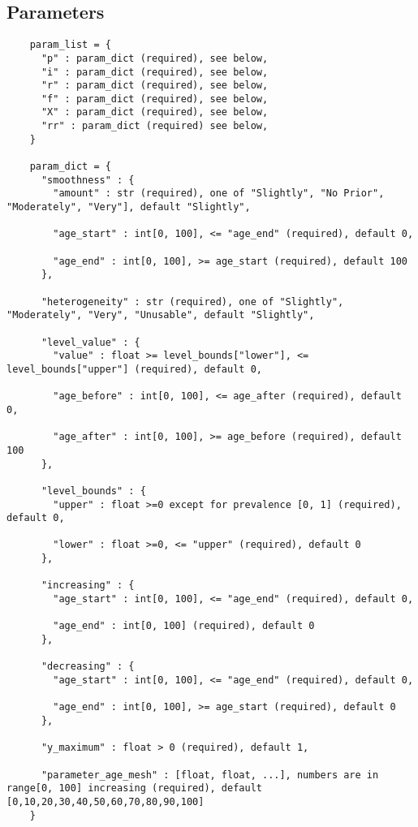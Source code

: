 \subsection{Parameters}
\begin{verbatim}
    param_list = {
      "p" : param_dict (required), see below,
      "i" : param_dict (required), see below,
      "r" : param_dict (required), see below,
      "f" : param_dict (required), see below,
      "X" : param_dict (required), see below,
      "rr" : param_dict (required) see below,
    }

    param_dict = {
      "smoothness" : {
        "amount" : str (required), one of "Slightly", "No Prior", "Moderately", "Very"], default "Slightly",

        "age_start" : int[0, 100], <= "age_end" (required), default 0,

        "age_end" : int[0, 100], >= age_start (required), default 100
      },

      "heterogeneity" : str (required), one of "Slightly", "Moderately", "Very", "Unusable", default "Slightly",

      "level_value" : {
        "value" : float >= level_bounds["lower"], <= level_bounds["upper"] (required), default 0,

        "age_before" : int[0, 100], <= age_after (required), default 0,

        "age_after" : int[0, 100], >= age_before (required), default 100
      },

      "level_bounds" : {
        "upper" : float >=0 except for prevalence [0, 1] (required), default 0,

        "lower" : float >=0, <= "upper" (required), default 0
      },

      "increasing" : {
        "age_start" : int[0, 100], <= "age_end" (required), default 0,

        "age_end" : int[0, 100] (required), default 0
      },

      "decreasing" : {
        "age_start" : int[0, 100], <= "age_end" (required), default 0,

        "age_end" : int[0, 100], >= age_start (required), default 0
      },

      "y_maximum" : float > 0 (required), default 1,

      "parameter_age_mesh" : [float, float, ...], numbers are in range[0, 100] increasing (required), default [0,10,20,30,40,50,60,70,80,90,100]
    }
\end{verbatim}

